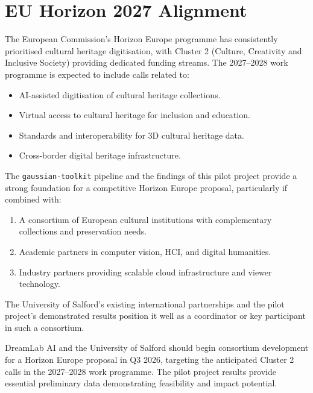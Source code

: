\section{EU Horizon 2027 Alignment}
\label{sec:fut-horizon}

The European Commission's Horizon Europe programme has consistently prioritised cultural heritage digitisation, with Cluster 2 (Culture, Creativity and Inclusive Society) providing dedicated funding streams. The 2027--2028 work programme is expected to include calls related to:

\begin{itemize}
  \item AI-assisted digitisation of cultural heritage collections.
  \item Virtual access to cultural heritage for inclusion and education.
  \item Standards and interoperability for 3D cultural heritage data.
  \item Cross-border digital heritage infrastructure.
\end{itemize}

The \texttt{gaussian-toolkit} pipeline and the findings of this pilot project provide a strong foundation for a competitive Horizon Europe proposal, particularly if combined with:

\begin{enumerate}
  \item A consortium of European cultural institutions with complementary collections and preservation needs.
  \item Academic partners in computer vision, HCI, and digital humanities.
  \item Industry partners providing scalable cloud infrastructure and viewer technology.
\end{enumerate}

The University of Salford's existing international partnerships and the pilot project's demonstrated results position it well as a coordinator or key participant in such a consortium.

\begin{recommendation}
DreamLab AI and the University of Salford should begin consortium development for a Horizon Europe proposal in Q3 2026, targeting the anticipated Cluster 2 calls in the 2027--2028 work programme. The pilot project results provide essential preliminary data demonstrating feasibility and impact potential.
\end{recommendation}

